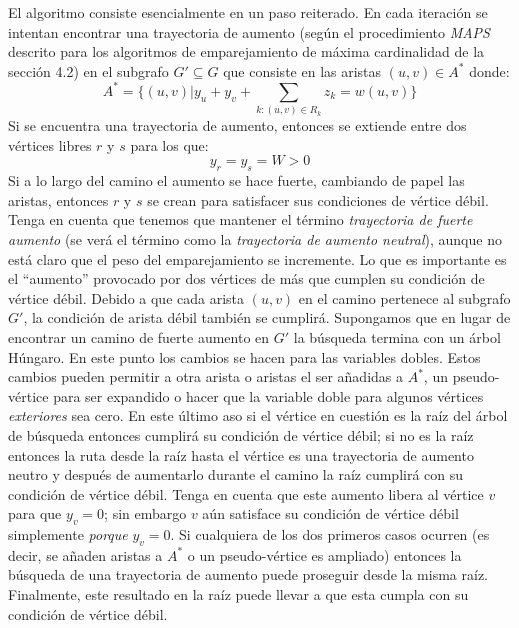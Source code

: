 \documentclass[10pt,a5paper]{book}
\begin{document}
El algoritmo consiste esencialmente en un paso reiterado. En cada iteración se intentan encontrar una trayectoria de aumento (según el procedimiento \emph{MAPS} descrito para los algoritmos de emparejamiento de máxima cardinalidad de la sección 4.2) en el subgrafo $G' \subseteq G$ que consiste en las aristas $(u,v) \in A^*$ donde:
\[A^* = \{(u,v)|y_u + y_v + \displaystyle{\sum_{k:(u,v)\in R_k}} z_k = w(u,v)\}\]
Si se encuentra una trayectoria de aumento, entonces se extiende entre dos vértices libres $r$ y $s$ para los que:
\[ y_r = y_s = W > 0 \]
Si a lo largo del camino el aumento se hace fuerte, cambiando de papel las aristas, entonces $r$ y $s$ se crean para satisfacer sus condiciones de vértice débil. Tenga en cuenta que tenemos que mantener el término \emph{trayectoria de fuerte aumento} (se verá el término como la \emph{trayectoria de aumento neutral}), aunque no está claro que el peso del emparejamiento se incremente. Lo que es importante es el ``aumento'' provocado por dos vértices de más que cumplen su condición de vértice débil. Debido a que cada arista $(u,v)$ en el camino pertenece al subgrafo $G'$, la condición de arista débil también se cumplirá. Supongamos que en lugar de encontrar un camino de fuerte aumento en $G'$ la búsqueda termina con un árbol Húngaro. En este punto los cambios se hacen para las variables dobles. Estos cambios pueden permitir a otra arista o aristas el ser añadidas a $A^*$, un pseudo-vértice para ser expandido o hacer que la variable doble para algunos vértices \emph{exteriores} sea cero. En este último aso si el vértice en cuestión es la raíz del árbol de búsqueda entonces cumplirá su condición de vértice débil; si no es la raíz entonces la ruta desde la raíz hasta el vértice es una trayectoria de aumento neutro y después de aumentarlo durante el camino la raíz cumplirá con su condición de vértice débil. Tenga en cuenta que este aumento libera al vértice $v$ para que $y_v = 0$; sin embargo $v$ aún satisface su condición de vértice débil simplemente \emph{porque} $y_v = 0$. Si cualquiera de los dos primeros casos ocurren (es decir, se añaden aristas a $A^*$ o un pseudo-vértice es ampliado) entonces la búsqueda de una trayectoria de aumento puede proseguir desde la misma raíz. Finalmente, este resultado en la raíz puede llevar a que esta cumpla con su condición de vértice débil.
\vfill
\end{document}
